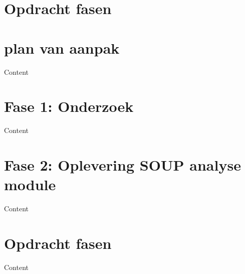 \section{Opdracht fasen}

\section{plan van aanpak}

Content
\section{Fase 1: Onderzoek}

Content
\section{Fase 2: Oplevering SOUP analyse module}

Content
\section{Opdracht fasen}

Content